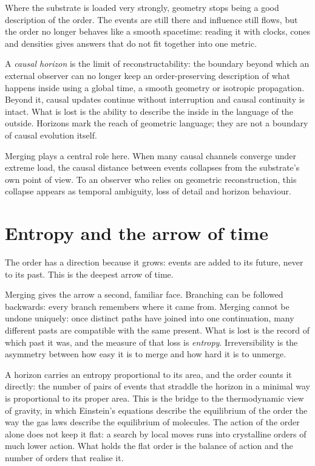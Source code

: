 Where the substrate is loaded very strongly, geometry stops being a good description of the order.
The events are still there and influence still flows, but the order no longer behaves like a smooth
spacetime: reading it with clocks, cones and densities gives answers that do not fit together into
one metric. 

A \emph{causal horizon} is the limit of reconstructability: the boundary beyond which an external
observer can no longer keep an order-preserving description of what happens inside using a global
time, a smooth geometry or isotropic propagation. Beyond it, causal updates continue without
interruption and causal continuity is intact. What is lost is the ability to describe the inside in
the language of the outside. Horizons mark the reach of geometric language; they are not a boundary
of causal evolution itself. 

Merging plays a central role here. When many causal channels converge under extreme load, the causal
distance between events collapses from the substrate's own point of view. To an observer who relies on
geometric reconstruction, this collapse appears as temporal ambiguity, loss of detail and horizon
behaviour. 

\section{Entropy and the arrow of time}\label{sec:onto-entropy}

The order has a direction because it grows: events are added to its future, never to its past. This
is the deepest arrow of time. 

Merging gives the arrow a second, familiar face. Branching can be followed backwards: every branch
remembers where it came from. Merging cannot be undone uniquely: once distinct paths have joined
into one continuation, many different pasts are compatible with the same present. What is lost is
the record of which past it was, and the measure of that loss is \emph{entropy}. Irreversibility is
the asymmetry between how easy it is to merge and how hard it is to unmerge. 

A horizon carries an entropy proportional to its area, and the order counts it directly: the number
of pairs of events that straddle the horizon in a minimal way is proportional to its proper area.
\quad This is the bridge to the thermodynamic view of gravity, in which Einstein's
equations describe the equilibrium of the order the way the gas laws describe the equilibrium of
molecules. \quad The action of the order alone does not keep it flat: a search by local moves runs into
crystalline orders of much lower action. What holds the flat order is the balance of action and the number of
orders that realise it. 

